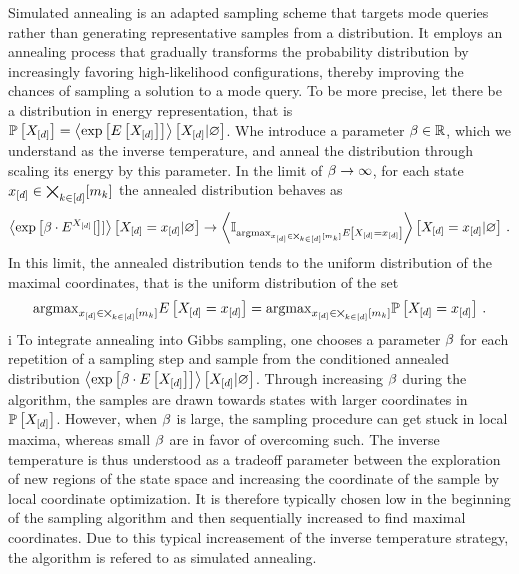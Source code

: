 Simulated annealing is an adapted sampling scheme that targets mode queries rather than generating representative samples from a distribution.
It employs an annealing process that gradually transforms the probability distribution by increasingly favoring high-likelihood configurations, thereby improving the chances of sampling a solution to a mode query.
To be more precise, let there be a distribution in energy representation, that is $\mathbb{P}\left[X_{[d]}\right]=\left\langle \mathrm{exp}\left[E\left[X_{[d]}\right]\right]\right\rangle \left[ X_{[d]} | \varnothing \right]$.
Whe introduce a parameter $\beta\in\mathbb{R}$, which we understand as the inverse temperature, and anneal the distribution through scaling its energy by this parameter.
In the limit of $\beta\rightarrow\infty$, for each state $x_{[d]}\in\bigtimes_{k\in[d]}[m_{k}]$ the annealed distribution behaves as
\begin{align*}
    \left\langle \mathrm{exp}\left[\beta\cdot E^{X_{[d]}}[\right]]\right\rangle \left[ X_{[d]}=x_{[d]} | \varnothing \right] \rightarrow
    \left\langle \mathbb{I}_{\mathrm{argmax}_{x_{[d]}\in\bigtimes_{k\in[d]}[m_{k}]}E\left[X_{[d]}=x_{[d]}\right]}\right\rangle \left[ X_{[d]}=x_{[d]} | \varnothing \right] \, .
\end{align*}
In this limit, the annealed distribution tends to the uniform distribution of the maximal coordinates, that is the uniform distribution of the set
\begin{align*}
    \mathrm{argmax}_{x_{[d]}\in\bigtimes_{k\in[d]}[m_{k}]}E\left[X_{[d]}=x_{[d]}\right] = \mathrm{argmax}_{x_{[d]}\in\bigtimes_{k\in[d]}[m_{k}]}\mathbb{P}\left[X_{[d]}=x_{[d]}\right] \, .
\end{align*}
i
To integrate annealing into Gibbs sampling, one chooses a parameter $\beta$ for each repetition of a sampling step and sample from the conditioned annealed distribution $\left\langle \mathrm{exp}\left[\beta\cdot E\left[X_{[d]}\right]\right]\right\rangle \left[ X_{[d]} | \varnothing \right]$.
Through increasing $\beta$ during the algorithm, the samples are drawn towards states with larger coordinates in $\mathbb{P}\left[X_{[d]}\right]$.
However, when $\beta$ is large, the sampling procedure can get stuck in local maxima, whereas small $\beta$ are in favor of overcoming such.
The inverse temperature is thus understood as a tradeoff parameter between the exploration of new regions of the state space and increasing the coordinate of the sample by local coordinate optimization.
It is therefore typically chosen low in the beginning of the sampling algorithm and then sequentially increased to find maximal coordinates.
Due to this typical increasement of the inverse temperature strategy, the algorithm is refered to as simulated annealing.


